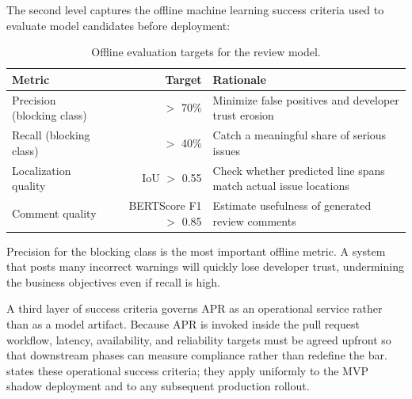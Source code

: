 \documentclass[11pt]{article}
\begin{document}
The second level captures the offline machine learning success criteria used to evaluate model candidates before deployment:

\begin{table}[H]
\centering
\caption{Offline evaluation targets for the review model.}
\label{tab:ml_criteria}
\begin{tabular}{@{}lrp{7.5cm}@{}}
\toprule
\textbf{Metric} & \textbf{Target} & \textbf{Rationale} \\ \midrule
Precision (blocking class) & $>$ 70\% & Minimize false positives and developer trust erosion \\ \midrule
Recall (blocking class) & $>$ 40\% & Catch a meaningful share of serious issues \\ \midrule
Localization quality & IoU $>$ 0.55 & Check whether predicted line spans match actual issue locations \\ \midrule
Comment quality & BERTScore F1 $>$ 0.85 & Estimate usefulness of generated review comments \\ \bottomrule
\end{tabular}
\end{table}

Precision for the blocking class is the most important offline metric. A system that posts many incorrect warnings will quickly lose developer trust, undermining the business objectives even if recall is high.

A third layer of success criteria governs APR as an operational service rather than as a model artifact. Because APR is invoked inside the pull request workflow, latency, availability, and reliability targets must be agreed upfront so that downstream phases can measure compliance rather than redefine the bar.  states these operational success criteria; they apply uniformly to the MVP shadow deployment and to any subsequent production rollout.
\end{document}
